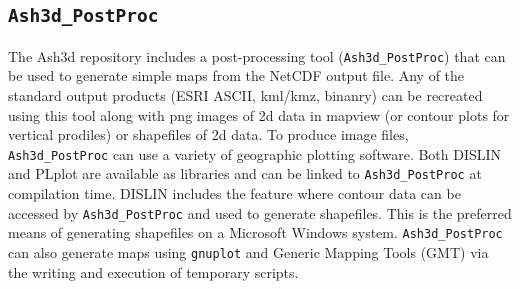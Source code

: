 \subsection{\texttt{Ash3d\_PostProc}}\label{ChapUsageSecPostProc_tool}
The Ash3d repository includes a post-processing tool (\texttt{Ash3d\_PostProc})
that can be used to generate simple maps from the NetCDF output file.
Any of the standard output products (ESRI ASCII, kml/kmz, binanry) can
be recreated using this tool along with png images of 2d data in mapview
(or contour plots for vertical prodiles) or shapefiles of 2d data. To
produce image files, \texttt{Ash3d\_PostProc} can use a variety of geographic
plotting software. Both DISLIN and PLplot are available as libraries and can
be linked to \texttt{Ash3d\_PostProc} at compilation time. DISLIN includes
the feature where contour data can be accessed by \texttt{Ash3d\_PostProc}
and used to generate shapefiles. This is the preferred means of generating
shapefiles on a Microsoft Windows system. \texttt{Ash3d\_PostProc} can also
generate maps using \texttt{gnuplot} and Generic Mapping Tools (GMT) via
the writing and execution of temporary scripts.

